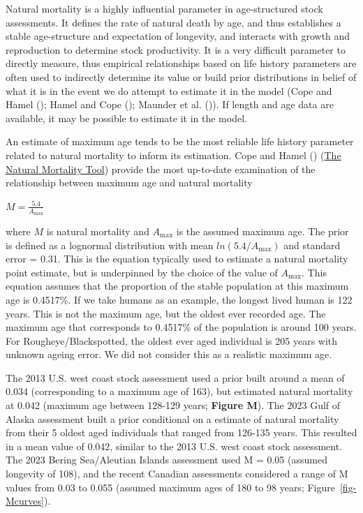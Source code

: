 \documentclass[
]{scrartcl}
\begin{document}
Natural mortality is a highly influential parameter in age-structured
stock assessments. It defines the rate of natural death by age, and thus
establishes a stable age-structure and expectation of longevity, and
interacts with growth and reproduction to determine stock productivity.
It is a very difficult parameter to directly measure, thus empirical
relationships based on life history parameters are often used to
indirectly determine its value or build prior distributions in belief of
what it is in the event we do attempt to estimate it in the model (Cope
and Hamel (); Hamel and Cope
(); Maunder et al.
()). If length and age data are
available, it may be possible to estimate it in the model.

An estimate of maximum age tends to be the most reliable life history
parameter related to natural mortality to inform its estimation. Cope
and Hamel ()
(\href{https://connect.fisheries.noaa.gov/natural-mortality-tool/}{The
Natural Mortality Tool}) provide the most up-to-date examination of the
relationship between maximum age and natural mortality

\begin{centering}

$M=\frac{5.4}{A_{\text{max}}}$

\end{centering}

\vspace{0.5cm}

where \(M\) is natural mortality and \({A_{\text{max}}}\) is the assumed
maximum age. The prior is defined as a lognormal distribution with mean
\(ln(5.4/A_{\text{max}})\) and standard error = 0.31. This is the
equation typically used to estimate a natural mortality point estimate,
but is underpinned by the choice of the value of \({A_{\text{max}}}\).
This equation assumes that the proportion of the stable population at
this maximum age is 0.4517\%. If we take humans as an example, the
longest lived human is 122 years. This is not the maximum age, but the
oldest ever recorded age. The maximum age that corresponds to 0.4517\%
of the population is around 100 years. For Rougheye/Blackspotted, the
oldest ever aged individual is 205 years with unknown ageing error. We
did not consider this as a realistic maximum age.

The 2013 U.S. west coast stock assessment used a prior built around a
mean of 0.034 (corresponding to a maximum age of 163), but estimated
natural mortality at 0.042 (maximum age between 128-129 years;
\textbf{Figure M}). The 2023 Gulf of Alaska assessment built a prior
conditional on a estimate of natural mortality from their 5 oldest aged
individuals that ranged from 126-135 years. This resulted in a mean
value of 0.042, similar to the 2013 U.S. west coast stock assessment.
The 2023 Bering Sea/Aleutian Islands assessment used M = 0.05 (assumed
longevity of 108), and the recent Canadian assessments considered a
range of M values from 0.03 to 0.055 (assumed maximum ages of 180 to 98
years; Figure~\ref{fig-Mcurves}).
\end{document}
